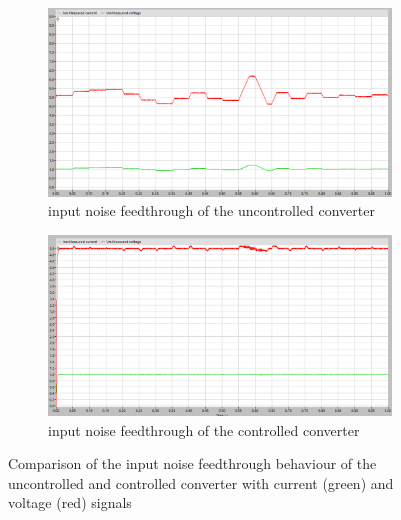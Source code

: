 \begin{figure}[htbp]
    \centering
    \begin{subfigure}[b]{0.49\textwidth}
        \centering
        \includegraphics[width=\textwidth]{img/v_i_noise_constant_load.png}
        \caption{input noise feedthrough of the uncontrolled converter}
        \label{fig:v_i_noise_feedthrough_uncontrolled}
    \end{subfigure}
    \hfill
    \begin{subfigure}[b]{0.49\textwidth}
        \centering
        \includegraphics[width=\textwidth]{img/v_i_noise_control_constant_load.png}
        \caption{input noise feedthrough of the controlled converter}
        \label{fig:v_i_noise_feedthrough_controlled}
    \end{subfigure}
    \caption{Comparison of the input noise feedthrough behaviour of the uncontrolled and controlled converter with current (green) and voltage (red) signals}
    \label{fig:comparison_input_noise_feedthrough}
\end{figure}


